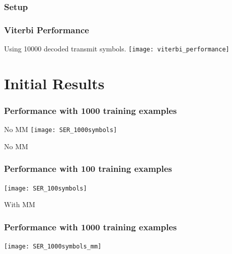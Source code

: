\documentclass[10pt,tgadventor, onlymath]{beamer}
\begin{document}
\begin{frame}
\frametitle{Setup}
\end{frame}

\begin{frame}
\frametitle{Viterbi Performance}
	Using 10000 decoded transmit symbols.
	\texttt{[image: viterbi\_performance]}
\end{frame}


\section{Initial Results}

\begin{frame}
\frametitle{Performance with 1000 training examples}
No MM
	\texttt{[image: SER\_1000symbols]}
\end{frame}

\begin{frame}
No MM
\frametitle{Performance with 100 training examples}
	\texttt{[image: SER\_100symbols]}
\end{frame}

\begin{frame}
With MM
\frametitle{Performance with 1000 training examples}
	\texttt{[image: SER\_1000symbols\_mm]}
\end{frame}
\end{document}

